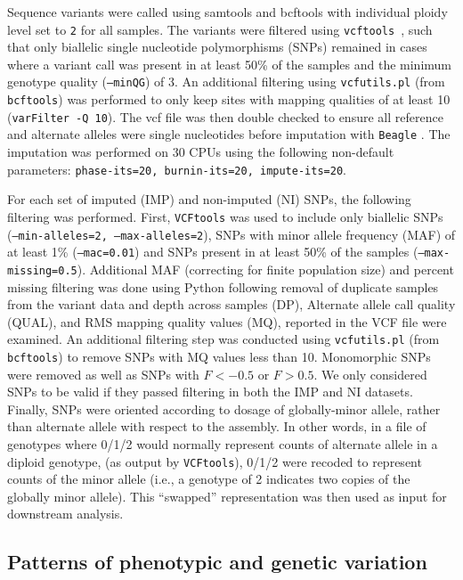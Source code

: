 \documentclass[smallextended]{svjour3}
\begin{document}
Sequence variants were called using samtools and bcftools \citep[][version
1.3]{Li:2009ka} with individual  ploidy level set to \texttt{2} for all
samples.
The variants were filtered  using \texttt{vcftools}~\citep[][version
0.1.14]{Danecek:2011gz}, such that only biallelic single nucleotide
polymorphisms (SNPs) remained in cases where a variant call was present in at
least 50\% of the samples and the minimum genotype quality (\texttt{--minQG})
of
3. An additional filtering using \texttt{vcfutils.pl} (from \texttt{bcftools})
was performed to only keep sites with mapping qualities of at least 10
(\texttt{varFilter -Q 10}). The vcf file was then double checked to ensure all
reference and alternate alleles were single nucleotides before imputation with
\texttt{Beagle} \citep[][version 4.0, r1399]{Browning:2007ge}.  The imputation
was performed on 30 CPUs using the following non-default parameters:
\texttt{phase-its=20, burnin-its=20, impute-its=20}.

For each set of imputed (IMP) and non-imputed (NI) SNPs, the following
filtering
was performed.  First, \texttt{VCFtools} was used to include only biallelic
SNPs (\texttt{--min-alleles=2, --max-alleles=2}), SNPs with minor allele
frequency (MAF) of at least 1\% (\texttt{--mac=0.01}) and SNPs present in at
least 50\% of the samples (\texttt{--max-missing=0.5}).  Additional MAF
(correcting for  finite population size) and percent missing filtering was done
using Python following removal of duplicate samples from the variant data and
depth across samples (DP), Alternate allele call quality (QUAL), and RMS
mapping
quality values (MQ), reported in the VCF file were examined.  An additional
filtering step was conducted using \texttt{vcfutils.pl} (from
\texttt{bcftools})
to remove SNPs with MQ values less than 10.  Monomorphic SNPs were removed as
well as SNPs with $F < -0.5$ or $F > 0.5$.  We only considered SNPs
to be valid if they passed filtering in both the IMP and NI datasets. Finally,
SNPs were oriented according to dosage of globally-minor allele, rather than
alternate allele with respect to the assembly. In other words, in a file of
genotypes where 0/1/2 would normally represent counts of alternate allele in a
diploid genotype,  (as output by \texttt{VCFtools}), 0/1/2 were recoded to
represent counts of the minor allele (i.e., a genotype of 2 indicates two
copies
of the globally minor allele). This ``swapped'' representation was then used as
input for downstream analysis.

\subsection*{Patterns of phenotypic and genetic variation}
\end{document}
